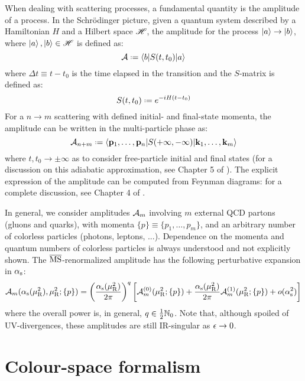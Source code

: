 When dealing with scattering processes, a fundamental quantity is the amplitude of a process. In the Schrödinger picture, given a quantum system described by a Hamiltonian $ H $ and a Hilbert space $ \mathscr{H} $, the amplitude for the process $ \ket{a} \rightarrow \ket{b} $, where $ \ket{a} , \ket{b} \in \mathscr{H} $ is defined as:
\begin{equation}
  \ampl \defeq \braket{b | \smat(t , t_0) | a}
\end{equation}
where $ \Delta t \equiv t - t_0 $ is the time elapsed in the transition and the $ S $-matrix is defined as:
\begin{equation}
  \smat(t , t_0) \defeq e^{- i H (t - t_0)}
\end{equation}
For a $ n \rightarrow m $ scattering with defined initial- and final-state momenta, the amplitude can be written in the multi-particle phase as:
\begin{equation}
  \ampl_{n + m} \defeq \braket{\ve{p}_1, \dots, \ve{p}_n | \smat(+\infty , -\infty) | \ve{k}_1, \dots, \ve{k}_m} 
\end{equation}
where $ t, t_0 \rightarrow \pm \infty $ as to consider free-particle initial and final states (for a discussion on this adiabatic approximation, see Chapter 5 of \cite{Itzykson-1980}). The explicit expression of the amplitude can be computed from Feynman diagrams: for a complete discussion, see Chapter 4 of \cite{Peskin-1995}.

In general, we consider amplitudes $ \mathcal{A}_m $ involving $ m $ external QCD partons (gluons and quarks), with momenta $ \{p\} \equiv \{p_1, \dots, p_m\} $, and an arbitrary number of colorless particles (photons, leptons, ...). Dependence on the momenta and quantum numbers of colorless particles is always understood and not explicitly shown. The $ \overline{\text{MS}} $-renormalized amplitude has the following perturbative expansion in $ \alpha_\text{s} $:
\begin{equation}
  \mathcal{A}_m(\alpha_\text{s}(\mu_\text{R}^2), \mu_\text{R}^2 ; \{p\}) = \left( \frac{\alpha_\text{s}(\mu_\text{R}^2)}{2\pi} \right)^q \left[ \mathcal{A}_m^{(0)}(\mu_\text{R}^2 ; \{p\}) + \frac{\alpha_\text{s}(\mu_\text{R}^2)}{2\pi} \mathcal{A}_m^{(1)}(\mu_\text{R}^2 ; \{p\}) + o(\alpha_\text{s}^2) \right]
  \label{eq:mat-exp}
\end{equation}
where the overall power is, in general, $ q \in \frac{1}{2} \mathbb{N}_0 $. Note that, although spoiled of UV-divergences, these amplitudes are still IR-singular as $ \epsilon \rightarrow 0 $.

\section{Colour-space formalism}
\label{sec:colour-space}

